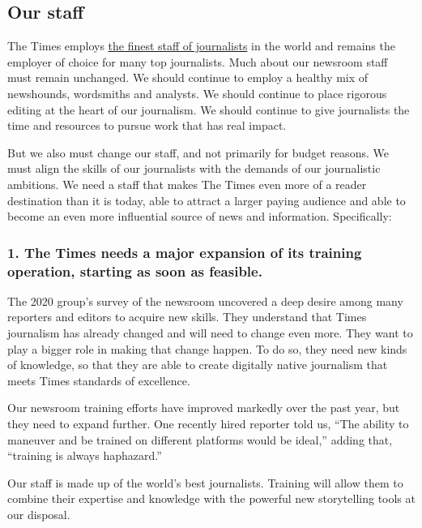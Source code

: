 \hypertarget{our-staff}{%
\subsection{Our staff}\label{our-staff}}

The Times employs \href{http://www.nytco.com/pulitzer-prizes/}{the
finest staff of journalists} in the world and remains the employer of
choice for many top journalists. Much about our newsroom staff must
remain unchanged. We should continue to employ a healthy mix of
newshounds, wordsmiths and analysts. We should continue to place
rigorous editing at the heart of our journalism. We should continue to
give journalists the time and resources to pursue work that has real
impact.

But we also must change our staff, and not primarily for budget reasons.
We must align the skills of our journalists with the demands of our
journalistic ambitions. We need a staff that makes The Times even more
of a reader destination than it is today, able to attract a larger
paying audience and able to become an even more influential source of
news and information. Specifically:

\hypertarget{1-the-times-needs-a-major-expansion-of-its-training-operation-starting-as-soon-as-feasible}{%
\subsubsection{1. The Times needs a major expansion of its training
operation, starting as soon as
feasible.}\label{1-the-times-needs-a-major-expansion-of-its-training-operation-starting-as-soon-as-feasible}}

The 2020 group's survey of the newsroom uncovered a deep desire among
many reporters and editors to acquire new skills. They understand that
Times journalism has already changed and will need to change even more.
They want to play a bigger role in making that change happen. To do so,
they need new kinds of knowledge, so that they are able to create
digitally native journalism that meets Times standards of excellence.

Our newsroom training efforts have improved markedly over the past year,
but they need to expand further. One recently hired reporter told us,
``The ability to maneuver and be trained on different platforms would be
ideal,'' adding that, ``training is always haphazard.''

Our staff is made up of the world's best journalists. Training will
allow them to combine their expertise and knowledge with the powerful
new storytelling tools at our disposal.

